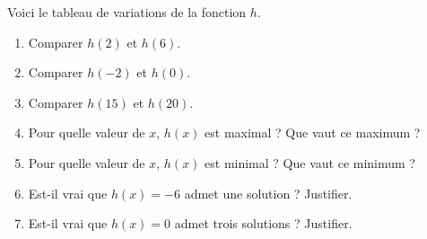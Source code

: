 
Voici le tableau de variations de la fonction $h$.

\begin{enumerate}
\item Comparer $h(2)$ et $h(6)$.
\item Comparer $h(-2)$ et $h(0)$.
\item Comparer $h(15)$ et $h(20)$.
\item Pour quelle valeur de $x$, $h(x)$ est maximal ? Que vaut ce maximum ?
\item Pour quelle valeur de $x$, $h(x)$ est minimal ? Que vaut ce minimum ?
\item Est-il vrai que $h(x)=-6$ admet une solution ? Justifier.
\item Est-il vrai que $h(x)=0$ admet trois solutions ? Justifier.
\end{enumerate}